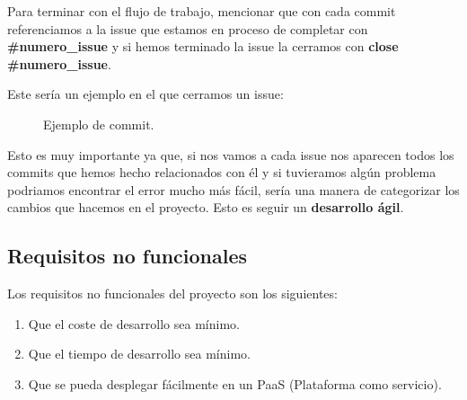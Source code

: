Para terminar con el flujo de trabajo, mencionar que con cada commit referenciamos a la issue que estamos en proceso de completar con \textbf{\#numero\_issue} y si
hemos terminado la issue la cerramos con \textbf{close \#numero\_issue}.

Este sería un ejemplo en el que cerramos un issue:

\begin{figure}[H]
	\centering
	\noindent{}
	\caption{Ejemplo de commit.}
	\end{figure}

Esto es muy importante ya que, si nos vamos a cada issue nos aparecen todos los commits que hemos hecho relacionados con él y si tuvieramos algún problema podriamos 
encontrar el error mucho más fácil, sería una manera de categorizar los cambios que hacemos en el proyecto. Esto es seguir un \textbf{desarrollo ágil}.

\subsection{Requisitos no funcionales}

Los requisitos no funcionales del proyecto son los siguientes:

\begin{enumerate}
	\item Que el coste de desarrollo sea mínimo.
	\item Que el tiempo de desarrollo sea mínimo.
	\item Que se pueda desplegar fácilmente en un PaaS (Plataforma como servicio).
  \end{enumerate}